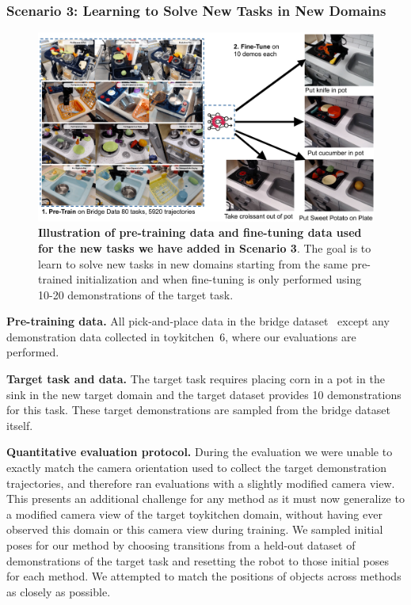 \documentclass[conference]{IEEEtran}
\begin{document}
\subsubsection{Scenario 3: Learning to Solve New Tasks in New Domains}

\begin{figure}
\centering
  \includegraphics[width=0.83\linewidth]{scenario3_overview.pdf}
  \caption{\footnotesize {\textbf{Illustration of pre-training data and fine-tuning data used for the new tasks we have added in Scenario 3}. The goal is to learn to solve new tasks in new domains starting from the same pre-trained initialization and when fine-tuning is only performed using 10-20 demonstrations of the target task.}}
  \label{fig:scenario4_overview}
\end{figure}

\textbf{Pre-training data.} All pick-and-place data in the bridge dataset~\citep{ebert2021bridge} except any demonstration data collected in toykitchen~6, where our evaluations are performed.

\textbf{Target task and data.} The target task requires placing corn in a pot in the sink in the new target domain and the target dataset provides 10 demonstrations for this task. These target demonstrations are sampled from the bridge dataset itself.

\textbf{Quantitative evaluation protocol.} During the evaluation we were unable to exactly match the camera orientation used to collect the target demonstration trajectories, and therefore ran evaluations with a slightly modified camera view. This presents an additional challenge for any method as it must now generalize to a modified camera view of the target toykitchen domain, without having ever observed this domain or this camera view during training. We sampled initial poses for our method by choosing transitions from a held-out dataset of demonstrations of the target task and resetting the robot to those initial poses for each method. We attempted to match the positions of objects across methods as closely as possible.
\end{document}
